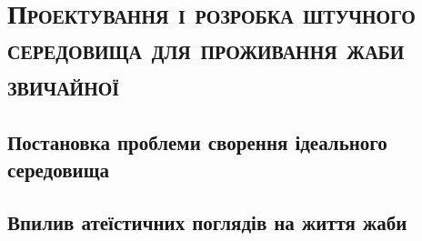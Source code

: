 
\newpage

\chapter{\textsc{Проектування\- і розробка\- штучного середовища для проживання жаби звичайної}}

\section{Постановка\- проблеми\- сворення ідеального середовища}

\section{Впилив атеїстичних поглядів на життя жаби}

